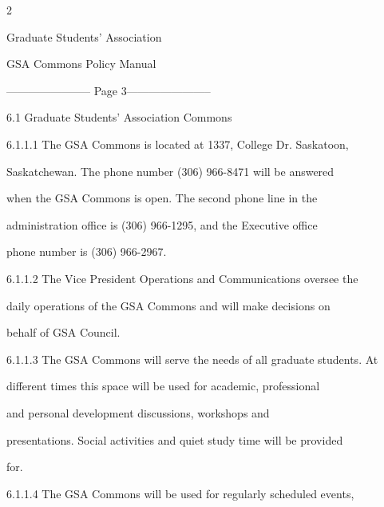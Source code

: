                                                

                                                                      2  

                                               

                                             Graduate Students’ Association  

                                              GSA Commons Policy Manual  

  


----------------------- Page 3-----------------------

        6.1      Graduate Students’ Association Commons   



  



6.1.1.1   The  GSA  Commons  is  located  at  1337,  College  Dr.  Saskatoon,  

           Saskatchewan. The phone number (306) 966-8471 will be answered  

           when  the  GSA  Commons  is  open.  The  second  phone  line  in  the  

           administration  office  is  (306)  966-1295,  and  the  Executive  office  

           phone number is (306) 966-2967.   



6.1.1.2   The  Vice  President  Operations  and  Communications  oversee  the  

           daily operations of the GSA Commons and will make decisions on  

           behalf of GSA Council.   



6.1.1.3   The GSA Commons will serve the needs of all graduate students. At  

           different  times  this  space  will  be  used  for  academic,  professional  

           and      personal       development          discussions,        workshops         and  

           presentations. Social activities and quiet study time will be provided  

           for.   



6.1.1.4   The  GSA  Commons  will  be  used  for  regularly  scheduled  events,  

